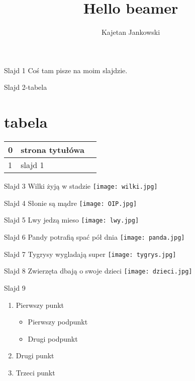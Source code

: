 \documentclass{beamer}
\title{Hello beamer}
\author{Kajetan Jankowski}
\begin{document}
\begin{frame}
\titlepage
\end{frame}
\begin{frame}{Slajd 1}
Coś tam pisze na moim slajdzie.
\end{frame}

\begin{frame}{Slajd 2-tabela}
\section {tabela}
\begin{tabular}{|l|p{5cm}|p{5cm}|} \hline
0  & strona tytułówa\\
\hline
1  & slajd 1\\ \hline
\end{tabular}
\end{frame}

\begin{frame}{Slajd 3}
Wilki żyją w stadzie
\texttt{[image: wilki.jpg]} 
\end{frame}

\begin{frame}{Slajd 4}
Słonie są mądre
\texttt{[image: OIP.jpg]} 
\end{frame}

\begin{frame}{Slajd 5}
Lwy jedzą mieso 
\texttt{[image: lwy.jpg]} 
\end{frame}

\begin{frame}{Slajd 6}
Pandy potrafią spać pół dnia
\texttt{[image: panda.jpg]} 
\end{frame}

\begin{frame}{Slajd 7}
Tygrysy wygladają super
\texttt{[image: tygrys.jpg]} 
\end{frame}

\begin{frame}{Slajd 8}
Zwierzęta dbają o swoje dzieci 
\texttt{[image: dzieci.jpg]} 
\end{frame}

\begin{frame}{Slajd 9}

\begin{enumerate}
\item Pierwszy punkt
\begin{itemize}
\item Pierwszy podpunkt
\item Drugi podpunkt
\end{itemize}
\item Drugi punkt
\item Trzeci punkt
\end{enumerate}


\end{frame}
\end{document}
